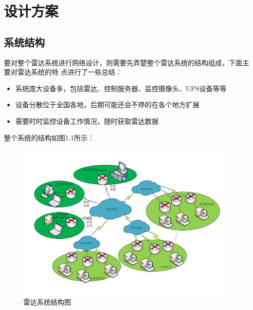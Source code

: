 \documentclass[a4paper,12pt]{report}
\begin{document}
\tableofcontents %

\chapter{设计方案}
\setcounter{page}{1}
\begin{spacing}{1.5}
\songti{}

\section{系统结构}
要对整个雷达系统进行网络设计，则需要先弄楚整个雷达系统的结构组成，下面主要对雷达系统的特
点进行了一些总结：
\begin{itemize}
\itemsep=3pt
\parskip=0pt
\setlength{\itemindent}{1em} 
\item 系统庞大设备多，包括雷达、控制服务器、监控摄像头、UPS设备等等
\item 设备分散位于全国各地，后期可能还会不停的在各个地方扩展
\item 需要时时监控设备工作情况，随时获取雷达数据
\end{itemize}

整个系统的结构如图1.1所示：
\begin{figure}[hbtp]
	\centering
	\includegraphics [width=1.0\textwidth]{figure//RadarSystem.pdf}
	\caption{雷达系统结构图}\label{RadarSystem}
\end{figure}


\end{spacing}
\end{document}
